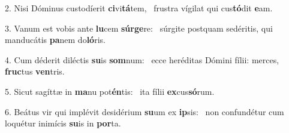 2. Nisi Dóminus custodíerit \textbf{ci}vi\textbf{tá}tem, \ast\  frustra vígilat qui cus\textbf{tó}dit \textbf{e}am.\

3. Vanum est vobis ante \textbf{lu}cem \textbf{súr}\textbf{ge}re: \ast\  súrgite postquam sedéritis, qui manducátis \textbf{pa}nem do\textbf{ló}ris.\

4. Cum déderit diléctis \textbf{su}is \textbf{som}num: \ast\  ecce heréditas Dómini fílii: merces, \textbf{fruc}tus \textbf{ven}tris.\

5. Sicut sagíttæ in \textbf{ma}nu pot\textbf{én}tis: \ast\  ita fílii \textbf{ex}cus\textbf{só}rum.\

6. Beátus vir qui implévit desidérium \textbf{su}um ex \textbf{ip}sis: \ast\  non confundétur cum loquétur inimícis \textbf{su}is in \textbf{por}ta.\

